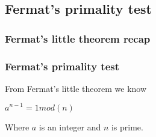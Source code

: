 
\subsection{Fermat's primality test}

\subsubsection{Fermat's little theorem recap}

\subsubsection{Fermat's primality test}

From Fermat's little theorem we know

\(a^{n-1}=1 mod(n)\)

Where \(a\) is an integer and \(n\) is prime.

